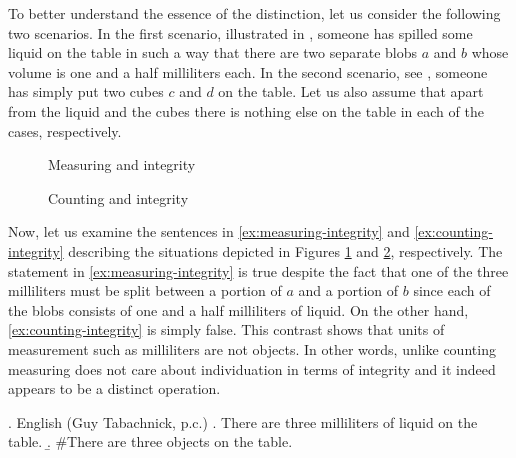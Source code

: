To better understand the essence of the distinction, let us consider the following two scenarios. In the first scenario, illustrated in  , someone has spilled some liquid on the table in such a way that there are two separate blobs $a$ and $b$ whose volume is one and a half milliliters each. In the second scenario, see , someone has simply put two cubes $c$ and $d$ on the table. Let us also assume that apart from the liquid and the cubes there is nothing else on the table in each of the cases, respectively.

\begin{figure}[h!]
	\centering
	\caption{Measuring and integrity}
	\label{fig:measuring-and-integrity}
\end{figure}

\begin{figure}[h!]
	\centering
	\caption{Counting and integrity}
	\label{fig:counting-and-integrity}
\end{figure}

Now, let us examine the sentences in \ref{ex:measuring-integrity} and \ref{ex:counting-integrity} describing the situations depicted in Figures \ref{fig:measuring-and-integrity} and \ref{fig:counting-and-integrity}, respectively. The statement in \ref{ex:measuring-integrity} is true despite the fact that one of the three milliliters must be split between a portion of $a$ and a portion of $b$ since each of the blobs consists of one and a half milliliters of liquid. On the other hand, \ref{ex:counting-integrity} is simply false. This contrast shows that units of measurement such as milliliters are not objects. In other words, unlike counting measuring does not care about individuation in terms of integrity and it indeed appears to be a distinct operation.

\ex. English (Guy Tabachnick, p.c.)\label{ex:measuring-counting-integrity}
\a. There are three milliliters of liquid on the table.\label{ex:measuring-integrity}
\b. \#There are three objects on the table.\label{ex:counting-integrity}

